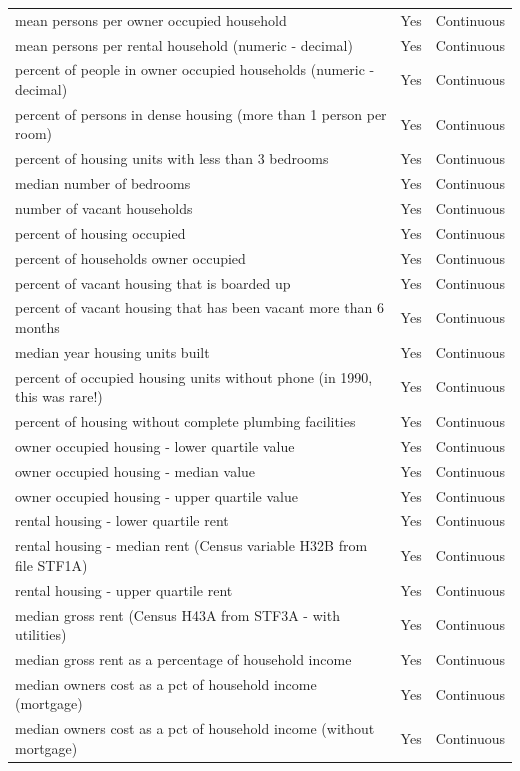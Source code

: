 \documentclass[
  11pt,
]{article}
\begin{document}
\begin{longtable}[t]{lll}
\addlinespace
mean persons per owner occupied household & Yes & Continuous\\
mean persons per rental household (numeric - decimal) & Yes & Continuous\\
percent of people in owner occupied households (numeric - decimal) & Yes & Continuous\\
percent of persons in dense housing (more than 1 person per room) & Yes & Continuous\\
percent of housing units with less than 3 bedrooms & Yes & Continuous\\
\addlinespace
median number of bedrooms & Yes & Continuous\\
number of vacant households & Yes & Continuous\\
percent of housing occupied & Yes & Continuous\\
percent of households owner occupied & Yes & Continuous\\
percent of vacant housing that is boarded up & Yes & Continuous\\
\addlinespace
percent of vacant housing that has been vacant more than 6 months & Yes & Continuous\\
median year housing units built & Yes & Continuous\\
percent of occupied housing units without phone (in 1990, this was rare!) & Yes & Continuous\\
percent of housing without complete plumbing facilities & Yes & Continuous\\
owner occupied housing - lower quartile value & Yes & Continuous\\
\addlinespace
owner occupied housing - median value & Yes & Continuous\\
owner occupied housing - upper quartile value & Yes & Continuous\\
rental housing - lower quartile rent & Yes & Continuous\\
rental housing - median rent (Census variable H32B from file STF1A) & Yes & Continuous\\
rental housing - upper quartile rent & Yes & Continuous\\
\addlinespace
median gross rent (Census H43A from STF3A - with utilities) & Yes & Continuous\\
median gross rent as a percentage of household income & Yes & Continuous\\
median owners cost as a pct of household income (mortgage) & Yes & Continuous\\
median owners cost as a pct of household income (without mortgage) & Yes & Continuous\\

\end{longtable}
\end{document}
